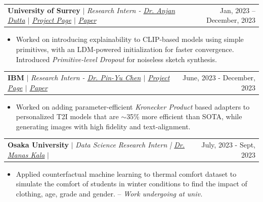 \documentclass[a4paper,11pt]{article}
\makeatletter
\newcommand{\resumeProjectHeading}[2]{
    \item
    \begin{tabular*}{0.97\textwidth}{l@{\extracolsep{\fill}}r}
      \small#1 & #2 \\
    \end{tabular*}\vspace{-7pt}
}
\newenvironment{tightemize}{\vspace{-\topsep}\begin{itemize}\itemsep1pt \parskip0pt \parsep0pt}{\end{itemize}\vspace{-\topsep}}
\makeatother
\begin{document}
{{        \resumeProjectHeading
          {\textbf{University of Surrey} $|$ \footnotesize\emph{Research Intern - \href{https://sites.google.com/site/2adutta/}{Dr. Anjan Dutta} $|$ \href{https://clipdrawx.github.io/}{\faIcon{link} Project Page} $|$ \href{https://arxiv.org/abs/2312.02345}{\faIcon{file-alt} Paper}}\vspace{8pt}}{Jan, 2023 -- December, 2023}
          \vspace{-0.9em}
          {\small{\begin{tightemize}
              \item Worked on introducing explainability to CLIP-based models using simple primitives, with an LDM-powered initialization for faster convergence. Introduced \emph{Primitive-level Dropout} for noiseless sketch synthesis.
          \end{tightemize}}}
          
        \resumeProjectHeading
          {\textbf{IBM} $|$ \footnotesize\emph{Research Intern - \href{https://sites.google.com/site/pinyuchenpage/home}{Dr. Pin-Yu Chen} $|$ \href{https://diffusekrona.github.io/}{\faIcon{link} Project Page} $|$ {\href{https://drive.google.com/file/d/18XHitHkBLS_dJC3PxrHBGReH7I6JxexX/view?usp=sharing}{\faIcon{file-alt} Paper}}}\vspace{8pt}}{June, 2023 - December, 2023}
          \vspace{-0.9em}
          {\small{\begin{tightemize}
              \item Worked on adding parameter-efficient \emph{Kronecker Product} based adapters to personalized T2I models that are $\sim$35\% more efficient than SOTA, while generating images with high fidelity and text-alignment.
          \end{tightemize}}}


        \resumeProjectHeading
          {\textbf{Osaka University}\vspace{8pt} $|$ \footnotesize\emph{Data Science Research Intern | \href{https://in.linkedin.com/in/manas-kala}{Dr. Manas Kala}} $|$ \href{https://github.com/nityanandmathur/thermal_comfort_cfml}{\faIcon{github}} \href{https://huggingface.co/spaces/nityanandmathur/thermal_comfort}{\faIcon{cloud}}}{July, 2023 - Sept, 2023}
          \vspace{-0.9em}
          \small{\begin{tightemize}
              \item Applied counterfactual machine learning to thermal comfort dataset to simulate the comfort of students in winter conditions to find the impact of clothing, age, grade and gender. -- \emph{Work undergoing at univ.}
          \end{tightemize}}

}}
\end{document}

